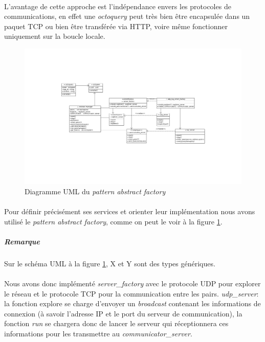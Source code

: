 \documentclass[a4paper]{article}
\begin{document}
			\paragraph{}{
			L’avantage de cette approche est l’indépendance envers les protocoles de communications, en effet
			une \textit{octoquery} peut très bien être encapsulée dans un paquet TCP ou bien être transférée via HTTP,
			 voire même fonctionner uniquement sur la boucle locale.
			}
			
			\begin{figure}[!h]
					\centering
					\includegraphics[scale=0.5]{UML/octonet_factory1.png}
					\caption{\label{factory_uml} Diagramme UML du \textit{pattern abstract factory}}
			\end{figure}
						
			
			\paragraph{}{
			Pour définir précisément ses services et orienter leur implémentation nous avons utilisé le
			\textit{pattern abstract factory}, comme on peut le voir à la figure \ref{factory_uml}.
			}
				\subparagraph{Remarque}{Sur le schéma UML à la figure \ref{factory_uml}, X et Y sont des types génériques.}
				
			\paragraph{}{
			Nous avons donc implémenté \textit{server\_factory} avec le protocole UDP pour explorer le réseau et le
			protocole TCP pour la communication entre les pairs. \newline
			\textit{udp\_server}: la fonction explore se charge d’envoyer un \textit{broadcast} contenant les informations de
			connexion (à savoir l’adresse IP et le port du serveur de communication), la fonction \textit{run} 
			se chargera donc de lancer le serveur qui réceptionnera ces informations pour les
			transmettre au \textit{communicator\_server}.
			}
			
\end{document}
